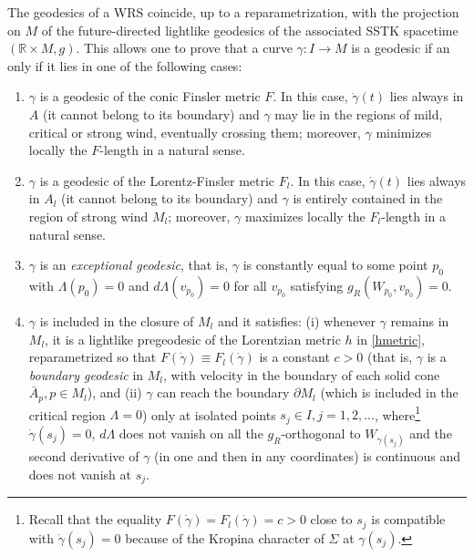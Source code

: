 \documentclass[reqno,10pt]{amsart}
\newcommand{\R}{\mathds R}
\begin{document}
The geodesics of a WRS coincide, up to a reparametrization, with the projection on $M$ of the future-directed lightlike geodesics of the associated SSTK spacetime $(\R\times M,g)$. This allows one to prove that a  curve $\gamma: I\rightarrow M$ is a geodesic if an only if it lies in one of the following cases: 
\begin{enumerate}
\item $\gamma$ is a geodesic of the conic Finsler metric $F$. In this case, $\dot\gamma(t)$ lies always in $A$ (it cannot belong to its boundary) and $\gamma$ may lie in the regions of mild, critical or strong wind, eventually crossing them; moreover,  $\gamma$ minimizes locally the $F$-length in a natural sense.

\item $\gamma$ is a geodesic of the Lorentz-Finsler metric $F_l$. In this case, $\dot\gamma(t)$ lies always in $A_l$ (it cannot belong to its boundary) and $\gamma$ is entirely contained in the region of strong wind $M_l$; moreover,  $\gamma$ maximizes locally the $F_l$-length in a natural sense.



\item  $\gamma$ is an {\em exceptional geodesic}, that is, $\gamma$ is constantly equal to some point $p_0$ 
with $\Lambda (p_0)=0$ and $d\Lambda(v_{p_0})=0$ for all 
$v_{p_0}$ %
satisfying $g_R(W_{p_0},v_{p_0})=0$.

\item $\gamma$ is included in the closure of $M_l$ and it satisfies: (i) whenever $\gamma$ remains in $M_l$,  it is 
a lightlike  pregeodesic of the Lorentzian metric $h$  in \eqref{hmetric},  reparametrized so that $F(\dot\gamma)\equiv  F_l(\dot\gamma)$ is a constant $c>0$ (that is, $\gamma$ is a {\em boundary geodesic} in $M_l$, with velocity in the boundary of each solid cone $\bar A_p, p\in M_l$), and (ii) $\gamma$ can reach the boundary $\partial M_l$ (which is included in the critical region $\Lambda=0$) only at  isolated points $s_j\in I, j=1,2,...$, where\footnote{Recall that the equality $F(\dot\gamma)=  F_l(\dot\gamma)=c>0$ close to $s_j$ is compatible with $\dot\gamma(s_j)=0$ because of the Kropina character of $\Sigma$ at $\gamma(s_j)$.}  
$\dot\gamma(s_j)=0$,  $d\Lambda$ does not vanish on all the $g_R$-orthogonal to $W_{\gamma(s_j)}$  and the second derivative of $\gamma$ (in one and then in any coordinates) is continuous and does not vanish at $s_j$.  

\end{enumerate} 
\end{document}
